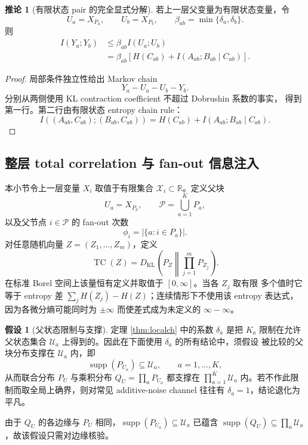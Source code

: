 \documentclass[a4paper,11pt]{article}
\theoremstyle{definition}
\newtheorem{corollary}{推论}
\newtheorem{assumption}{假设}
\newcommand{\R}{\mathbb R}
\newcommand{\1}{\mathbf 1}
\newcommand{\KL}{\mathrm{KL}}
\newcommand{\supp}{\operatorname{supp}}
\newcommand{\TC}{\operatorname{TC}}
\newcommand{\Pset}{\mathcal P}
\begin{document}
\begin{corollary}[有限状态 pair 的完全显式分解]
若上一层父变量为有限状态变量，令
\[
U_a=X_{P_a},\qquad U_b=X_{P_b},
\qquad
\beta_{ab}=\min\{\delta_a,\delta_b\}.
\]
则
\[
\begin{aligned}
I(Y_a;Y_b)
&\le \beta_{ab}I(U_a;U_b)\\
&=\beta_{ab}
\left[
H(C_{ab})
+
I(A_{ab};B_{ab}\mid C_{ab})
\right].
\end{aligned}
\]
\end{corollary}

\begin{proof}
局部条件独立性给出 Markov chain
\[
Y_a-U_a-U_b-Y_b.
\]
分别从两侧使用 KL contraction coefficient 不超过 Dobrushin 系数的事实，
得到第一行。第二行由有限状态 entropy chain rule：
\[
I((A_{ab},C_{ab});(B_{ab},C_{ab}))
=H(C_{ab})+I(A_{ab};B_{ab}\mid C_{ab}).
\]
\end{proof}

\subsection{整层 total correlation 与 fan-out 信息注入}

本小节令上一层变量 $X_i$ 取值于有限集合 $\mathcal X_i\subset\R$。定义父块
\[
U_a=X_{P_a},
\qquad
\Pset=\bigcup_{a=1}^{K}P_a,
\]
以及父节点 $i\in\Pset$ 的 fan-out 次数
\[
\phi_i=|\{a:i\in P_a\}|.
\]
对任意随机向量 $Z=(Z_1,\ldots,Z_m)$，定义
\begin{equation}
\label{eq:tcdef}
\TC(Z)
=
D_{\KL}\left(P_Z\middle\|\prod_{j=1}^{m}P_{Z_j}\right) .
\end{equation}
在标准 Borel 空间上该量恒有定义并取值于 $[0,\infty]$。当各 $Z_j$ 取有限
多个值时它等于 entropy 差 $\sum_{j}H(Z_j)-H(Z)$；连续情形下不使用该
entropy 表达式，因为各微分熵可能同时为 $\pm\infty$ 而使差式成为未定义的
$\infty-\infty$。

\begin{assumption}[父状态限制与支撑]
\label{ass:support}
定理 \ref{thm:localch} 中的系数 $\delta_a$ 是把 $K_a$ 限制在允许父状态集合
$\mathcal U_a$ 上得到的。因此在下面使用 $\delta_a$ 的所有结论中，须假设
被比较的父块分布支撑在 $\mathcal U_a$ 内，即
\[
\supp(P_{U_a})\subseteq\mathcal U_a,
\qquad a=1,\ldots,K,
\]
从而联合分布 $P_U$ 与乘积分布 $Q_U=\prod_a P_{U_a}$ 都支撑在
$\prod_{a=1}^{K}\mathcal U_a$ 内。若不作此限制而取全局上确界，则对常见
additive-noise channel 往往有 $\delta_a=1$，结论退化为平凡。
\end{assumption}

由于 $Q_U$ 的各边缘与 $P_U$ 相同，$\supp(P_{U_a})\subseteq\mathcal U_a$
已蕴含 $\supp(Q_U)\subseteq\prod_a\mathcal U_a$，故该假设只需对边缘核验。
\end{document}
